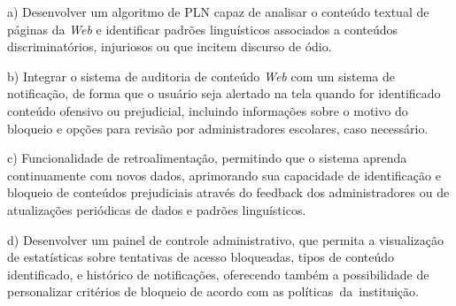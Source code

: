 a) Desenvolver um algoritmo de PLN capaz de analisar o conteúdo textual de páginas da \textit{Web} e identificar padrões linguísticos associados a conteúdos discriminatórios, injuriosos ou que incitem discurso de ódio.

b) Integrar o sistema de auditoria de conteúdo \textit{Web} com um sistema de notificação, de forma que o usuário seja alertado na tela quando for identificado conteúdo ofensivo ou prejudicial, incluindo informações sobre o motivo do bloqueio e opções para revisão por administradores escolares, caso necessário.

c) Funcionalidade de retroalimentação, permitindo que o sistema aprenda continuamente com novos dados, aprimorando sua capacidade de identificação e bloqueio de conteúdos prejudiciais através do feedback dos administradores ou de atualizações periódicas de dados e padrões linguísticos.

d) Desenvolver um painel de controle administrativo, que permita a visualização de estatísticas sobre tentativas de acesso bloqueadas, tipos de conteúdo identificado, e histórico de notificações, oferecendo também a possibilidade de personalizar critérios de bloqueio de acordo com as políticas da instituição.